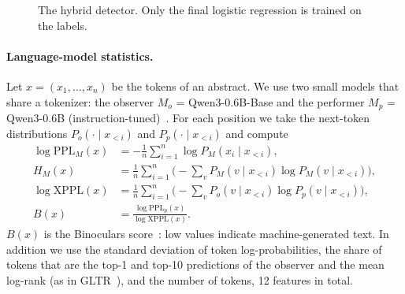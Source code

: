 \documentclass{article}
\begin{document}
\begin{figure}[!tbh]
\centering
{}
\caption{The hybrid detector. Only the final logistic regression is trained on the labels.}
\label{fig:pipeline}
\end{figure}

\paragraph{Language-model statistics.}
Let $x = (x_1,\dots,x_n)$ be the tokens of an abstract. We use two small models that share a tokenizer: the observer $M_o$ = Qwen3-0.6B-Base and the performer $M_p$ = Qwen3-0.6B (instruction-tuned)~\cite{qwen3}. For each position we take the next-token distributions $P_o(\cdot\mid x_{<i})$ and $P_p(\cdot\mid x_{<i})$ and compute
\begin{align}
\log \mathrm{PPL}_M(x) &= -\frac{1}{n}\sum_{i=1}^{n} \log P_M(x_i\mid x_{<i}), \\
H_M(x) &= \frac{1}{n}\sum_{i=1}^{n} \Big(-\sum_{v} P_M(v\mid x_{<i}) \log P_M(v\mid x_{<i})\Big), \\
\log \mathrm{XPPL}(x) &= \frac{1}{n}\sum_{i=1}^{n} \Big(-\sum_{v} P_o(v\mid x_{<i}) \log P_p(v\mid x_{<i})\Big), \\
B(x) &= \frac{\log \mathrm{PPL}_{p}(x)}{\log \mathrm{XPPL}(x)}.
\end{align}
$B(x)$ is the Binoculars score~\cite{binoculars}: low values indicate machine-generated text. In addition we use the standard deviation of token log-probabilities, the share of tokens that are the top-1 and top-10 predictions of the observer and the mean log-rank (as in GLTR~\cite{gltr}), and the number of tokens, 12 features in total.
\end{document}
